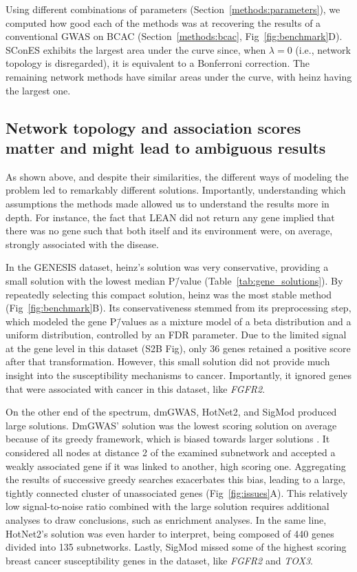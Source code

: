 \documentclass[10pt,letterpaper]{article}
\begin{document}
Using different combinations of parameters (Section~\ref{methods:parameters}), we computed how good each of the methods was at recovering the results of a conventional GWAS on BCAC (Section~\ref{methods:bcac}, Fig~\ref{fig:benchmark}D). SConES exhibits the largest area under the curve since, when $\lambda = 0$ (i.e., network topology is disregarded), it is equivalent to a Bonferroni correction. The remaining network methods have similar areas under the curve, with heinz having the largest one.

\subsection{Network topology and association scores matter and might lead to ambiguous results}
\label{results:drawbacks}

As shown above, and despite their similarities, the different ways of modeling the problem led to remarkably different solutions. Importantly, understanding which assumptions the methods made allowed us to understand the results more in depth. For instance, the fact that LEAN did not return any gene implied that there was no gene such that both itself and its environment were, on average, strongly associated with the disease.

In the GENESIS dataset, heinz's solution was very conservative, providing a small solution with the lowest median P\=/value (Table~\ref{tab:gene_solutions}). By repeatedly selecting this compact solution, heinz was the most stable method (Fig~\ref{fig:benchmark}B). Its conservativeness stemmed from its preprocessing step, which modeled the gene P\=/values as a mixture model of a beta distribution and a uniform distribution, controlled by an FDR parameter. Due to the limited signal at the gene level in this dataset (S2B Fig), only 36 genes retained a positive score after that transformation. However, this small solution did not provide much insight into the susceptibility mechanisms to cancer. Importantly, it ignored genes that were associated with cancer in this dataset, like \emph{FGFR2}. 

On the other end of the spectrum, dmGWAS, HotNet2, and SigMod produced large solutions. DmGWAS' solution was the lowest scoring solution on average because of its greedy framework, which is biased towards larger solutions \cite{nikolayeva_network_2018}. It considered all nodes at distance 2 of the examined subnetwork and accepted a weakly associated gene if it was linked to another, high scoring one. Aggregating the results of successive greedy searches exacerbates this bias, leading to a large, tightly connected cluster of unassociated genes (Fig~\ref{fig:issues}A). This relatively low signal-to-noise ratio combined with the large solution requires additional analyses to draw conclusions, such as enrichment analyses. In the same line, HotNet2's solution was even harder to interpret, being composed of 440 genes divided into 135 subnetworks. Lastly, SigMod missed some of the highest scoring breast cancer susceptibility genes in the dataset, like \emph{FGFR2} and \emph{TOX3}.
\end{document}
